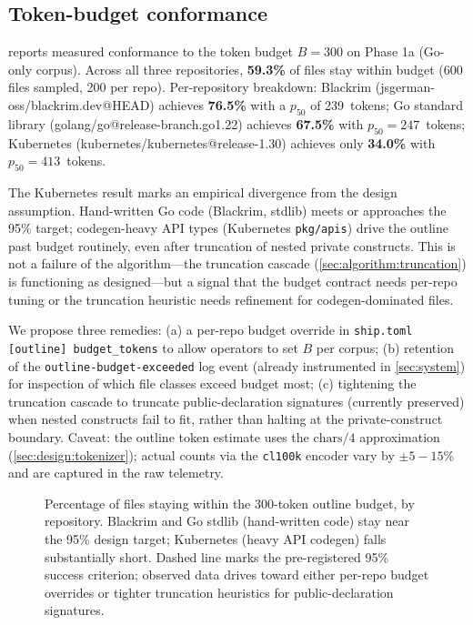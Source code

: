 \subsection{Token-budget conformance}
\label{sec:eval:budget}

 reports measured conformance to the token budget
$B = 300$ on Phase 1a (Go-only corpus). Across all three repositories,
\textbf{59.3\%} of files stay within budget (600 files sampled,
200 per repo). Per-repository breakdown: Blackrim (jsgerman-oss/blackrim.dev@HEAD)
achieves \textbf{76.5\%} with a $p_{50}$ of 239~tokens; Go standard
library (golang/go@release-branch.go1.22) achieves \textbf{67.5\%}
with $p_{50} = 247$~tokens; Kubernetes
(kubernetes/kubernetes@release-1.30) achieves only \textbf{34.0\%}
with $p_{50} = 413$~tokens.

The Kubernetes result marks an empirical divergence from the design
assumption. Hand-written Go code (Blackrim, stdlib) meets or approaches
the 95\% target; codegen-heavy API types (Kubernetes \texttt{pkg/apis})
drive the outline past budget routinely, even after truncation of
nested private constructs. This is not a failure of the algorithm---the
truncation cascade (\cref{sec:algorithm:truncation}) is functioning
as designed---but a signal that the budget contract needs per-repo tuning
or the truncation heuristic needs refinement for codegen-dominated files.

We propose three remedies: (a) a per-repo budget override in
\texttt{ship.toml [outline] budget\_tokens} to allow operators to set
$B$ per corpus; (b) retention of the \texttt{outline-budget-exceeded}
log event (already instrumented in \cref{sec:system}) for inspection
of which file classes exceed budget most; (c) tightening the truncation
cascade to truncate public-declaration signatures (currently preserved)
when nested constructs fail to fit, rather than halting at the private-construct
boundary. Caveat: the outline token estimate uses the $\text{chars}/4$
approximation (\cref{sec:design:tokenizer}); actual counts via the
\texttt{cl100k} encoder vary by $\pm 5{-}15\%$ and are captured in the
raw telemetry.

\begin{figure}[ht]
\centering

\caption{Percentage of files staying within the 300-token outline budget,
by repository. Blackrim and Go stdlib (hand-written code) stay near the
95\% design target; Kubernetes (heavy API codegen) falls substantially
short. Dashed line marks the pre-registered 95\% success criterion;
observed data drives toward either per-repo budget overrides or
tighter truncation heuristics for public-declaration signatures.}
\label{fig:budget}
\end{figure}

